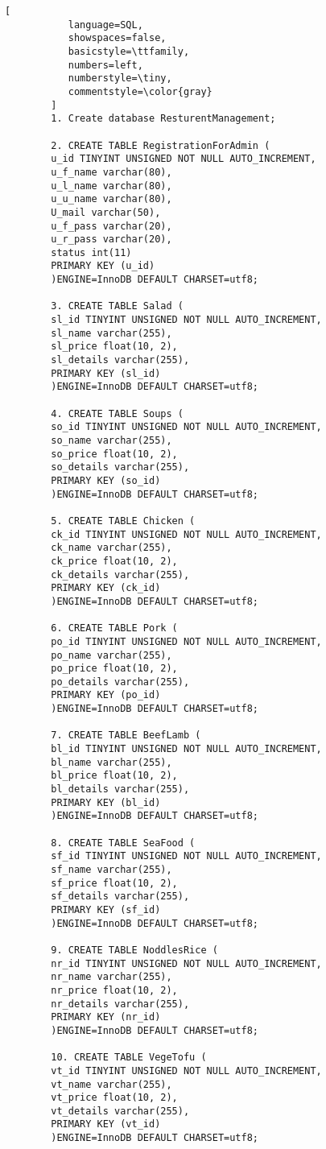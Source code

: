 \documentclass[12pt,a4paper]{article}
\begin{document}
	\begin{lstlisting}[
           language=SQL,
           showspaces=false,
           basicstyle=\ttfamily,
           numbers=left,
           numberstyle=\tiny,
           commentstyle=\color{gray}
        ]
		1. Create database ResturentManagement;
		
		2. CREATE TABLE RegistrationForAdmin (
		u_id TINYINT UNSIGNED NOT NULL AUTO_INCREMENT,
		u_f_name varchar(80),
		u_l_name varchar(80),
		u_u_name varchar(80),
		U_mail varchar(50),
		u_f_pass varchar(20),
		u_r_pass varchar(20),
		status int(11)
		PRIMARY KEY (u_id)
		)ENGINE=InnoDB DEFAULT CHARSET=utf8;
		
		3. CREATE TABLE Salad (
		sl_id TINYINT UNSIGNED NOT NULL AUTO_INCREMENT,
		sl_name varchar(255),
		sl_price float(10, 2),
		sl_details varchar(255),
		PRIMARY KEY (sl_id)
		)ENGINE=InnoDB DEFAULT CHARSET=utf8;

 		4. CREATE TABLE Soups (
		so_id TINYINT UNSIGNED NOT NULL AUTO_INCREMENT,
		so_name varchar(255),
		so_price float(10, 2),
		so_details varchar(255),
		PRIMARY KEY (so_id)
		)ENGINE=InnoDB DEFAULT CHARSET=utf8;

  		5. CREATE TABLE Chicken (
		ck_id TINYINT UNSIGNED NOT NULL AUTO_INCREMENT,
		ck_name varchar(255),
		ck_price float(10, 2),
		ck_details varchar(255),
		PRIMARY KEY (ck_id)
		)ENGINE=InnoDB DEFAULT CHARSET=utf8;

		6. CREATE TABLE Pork (
		po_id TINYINT UNSIGNED NOT NULL AUTO_INCREMENT,
		po_name varchar(255),
		po_price float(10, 2),
		po_details varchar(255),
		PRIMARY KEY (po_id)
		)ENGINE=InnoDB DEFAULT CHARSET=utf8;

	 	7. CREATE TABLE BeefLamb (
		bl_id TINYINT UNSIGNED NOT NULL AUTO_INCREMENT,
		bl_name varchar(255),
		bl_price float(10, 2),
		bl_details varchar(255),
		PRIMARY KEY (bl_id)
		)ENGINE=InnoDB DEFAULT CHARSET=utf8;

		8. CREATE TABLE SeaFood (
		sf_id TINYINT UNSIGNED NOT NULL AUTO_INCREMENT,
		sf_name varchar(255),
		sf_price float(10, 2),
		sf_details varchar(255),
		PRIMARY KEY (sf_id)
		)ENGINE=InnoDB DEFAULT CHARSET=utf8;

	 	9. CREATE TABLE NoddlesRice (
		nr_id TINYINT UNSIGNED NOT NULL AUTO_INCREMENT,
		nr_name varchar(255),
		nr_price float(10, 2),
		nr_details varchar(255),
		PRIMARY KEY (nr_id)
		)ENGINE=InnoDB DEFAULT CHARSET=utf8;

	 	10. CREATE TABLE VegeTofu (
		vt_id TINYINT UNSIGNED NOT NULL AUTO_INCREMENT,
		vt_name varchar(255),
		vt_price float(10, 2),
		vt_details varchar(255),
		PRIMARY KEY (vt_id)
		)ENGINE=InnoDB DEFAULT CHARSET=utf8;


\end{lstlisting}
\end{document}
